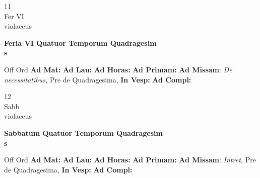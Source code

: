 \documentclass[10pt, openany]{book}
\begin{document}
    \begin{center}
        \begin{minipage}{3.5in}
            \vspace{2em}
            \begin{minipage}{0.5in}
                {\Huge 11} \\
                {\normalsize Fer VI} \\
                {\normalsize violaceus}
            \end{minipage}
            \begin{minipage}{3.0in}
                \textbf{ \large Feria VI Quatuor Temporum Quadragesim \\
                \textnormal{\normalsize s}} \\ 
            \end{minipage}
            \begin{justify}Off Ord
                \textbf{Ad Mat: }
                \textbf{Ad Lau: }
                \textbf{Ad Horas: }
                \textbf{Ad Primam: }\textbf{Ad Missam}: \textit{De necessitatibus,} Pre de Quadragesima,  
                \textbf{In Vesp: }
                \textbf{Ad Compl: }
            \end{justify}
        \end{minipage}
    \end{center}

    \begin{center}
        \begin{minipage}{3.5in}
            \vspace{2em}
            \begin{minipage}{0.5in}
                {\Huge 12} \\
                {\normalsize Sabb} \\
                {\normalsize violaceus}
            \end{minipage}
            \begin{minipage}{3.0in}
                \textbf{ \large Sabbatum Quatuor Temporum Quadragesim \\
                \textnormal{\normalsize s}} \\ 
            \end{minipage}
            \begin{justify}Off Ord
                \textbf{Ad Mat: }
                \textbf{Ad Lau: }
                \textbf{Ad Horas: }
                \textbf{Ad Primam: }\textbf{Ad Missam}: \textit{Intret,} Pre de Quadragesima,  
                \textbf{In Vesp: }
                \textbf{Ad Compl: }
            \end{justify}
        \end{minipage}
    \end{center}
\end{document}
